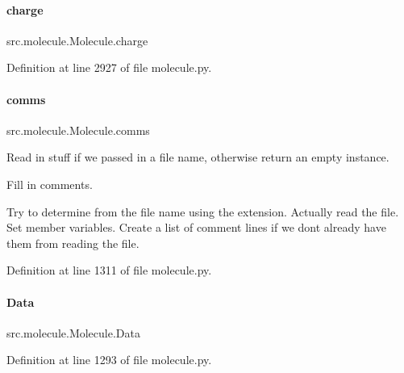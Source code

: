 \paragraph{\texorpdfstring{charge}{charge}}
{\footnotesize\ttfamily src.\+molecule.\+Molecule.\+charge}



Definition at line 2927 of file molecule.\+py.

\mbox{\label{classsrc_1_1molecule_1_1Molecule_a36609ce51ce26648178b39f22343f085}} 
\paragraph{\texorpdfstring{comms}{comms}}
{\footnotesize\ttfamily src.\+molecule.\+Molecule.\+comms}



Read in stuff if we passed in a file name, otherwise return an empty instance. 

Fill in comments.

Try to determine from the file name using the extension. Actually read the file. Set member variables. Create a list of comment lines if we don\textquotesingle{}t already have them from reading the file.

Definition at line 1311 of file molecule.\+py.

\mbox{\label{classsrc_1_1molecule_1_1Molecule_a0270df3966f56e55abb73ab7de5a3e77}} 
\paragraph{\texorpdfstring{Data}{Data}}
{\footnotesize\ttfamily src.\+molecule.\+Molecule.\+Data}



Definition at line 1293 of file molecule.\+py.

\mbox{\label{classsrc_1_1molecule_1_1Molecule_a96266112f8af20de9810e2fee0d5861c}} 
